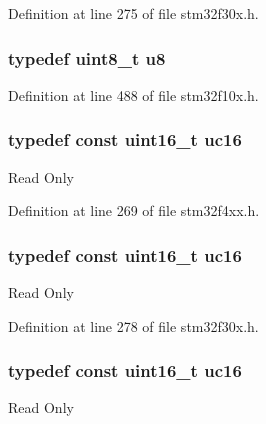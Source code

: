 Definition at line 275 of file stm32f30x.\-h.

\hypertarget{group___exported__types_ga92c50087ca0e64fa93fc59402c55f8ca}{
\subsubsection[{u8}]{\setlength{\rightskip}{0pt plus 5cm}typedef {\bf uint8\-\_\-t} {\bf u8}}}\label{group___exported__types_ga92c50087ca0e64fa93fc59402c55f8ca}


Definition at line 488 of file stm32f10x.\-h.

\hypertarget{group___exported__types_gabc715ea3779494b5a4f53173a397f7cb}{
\subsubsection[{uc16}]{\setlength{\rightskip}{0pt plus 5cm}typedef {\bf const} {\bf uint16\-\_\-t} {\bf uc16}}}\label{group___exported__types_gabc715ea3779494b5a4f53173a397f7cb}
Read Only 

Definition at line 269 of file stm32f4xx.\-h.

\hypertarget{group___exported__types_gabc715ea3779494b5a4f53173a397f7cb}{
\subsubsection[{uc16}]{\setlength{\rightskip}{0pt plus 5cm}typedef {\bf const} {\bf uint16\-\_\-t} {\bf uc16}}}\label{group___exported__types_gabc715ea3779494b5a4f53173a397f7cb}
Read Only 

Definition at line 278 of file stm32f30x.\-h.

\hypertarget{group___exported__types_gabc715ea3779494b5a4f53173a397f7cb}{
\subsubsection[{uc16}]{\setlength{\rightskip}{0pt plus 5cm}typedef {\bf const} {\bf uint16\-\_\-t} {\bf uc16}}}\label{group___exported__types_gabc715ea3779494b5a4f53173a397f7cb}
Read Only 

